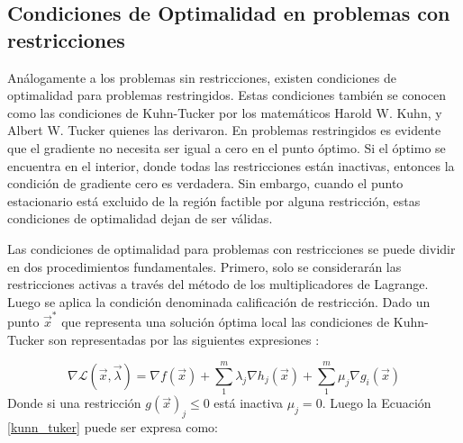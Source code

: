 \subsection{Condiciones de Optimalidad en problemas con restricciones}
Análogamente a los problemas sin restricciones, existen condiciones de optimalidad para problemas restringidos. Estas condiciones también se conocen como las condiciones de Kuhn-Tucker por los matemáticos  Harold W. Kuhn, y  Albert W. Tucker quienes las derivaron. En problemas restringidos es evidente que el gradiente no necesita ser igual a cero en el punto óptimo.  Si el óptimo se encuentra en el interior, donde todas las restricciones están inactivas, entonces la condición de gradiente cero es verdadera. Sin embargo, cuando el punto estacionario está excluido de la región factible por alguna restricción, estas condiciones de optimalidad dejan de ser válidas. 

Las condiciones de optimalidad para problemas con restricciones se puede dividir en dos procedimientos fundamentales. Primero, solo se considerarán las restricciones activas a través del método de los multiplicadores de Lagrange. Luego se aplica la condición denominada calificación de restricción. 
Dado un punto $\vec{x}^*$ que representa una solución óptima local las condiciones de Kuhn-Tucker son representadas por las siguientes expresiones \cite{arora_optimization:_2015}:

\begin{equation}
\nabla \mathcal{L} (\vec{x},\vec{\lambda})= \nabla f(\vec{x})+ \sum_{1}^m \lambda_j  \nabla h_j(\vec{x})+ \sum_{1}^m \mu_j  \nabla g_i(\vec{x})
\label{kunn_tuker}
\end{equation}
Donde si una restricción $g(\vec{x})_j\leq 0$ está inactiva $\mu_j =0$. Luego la Ecuación \ref{kunn_tuker} puede ser expresa como:  


